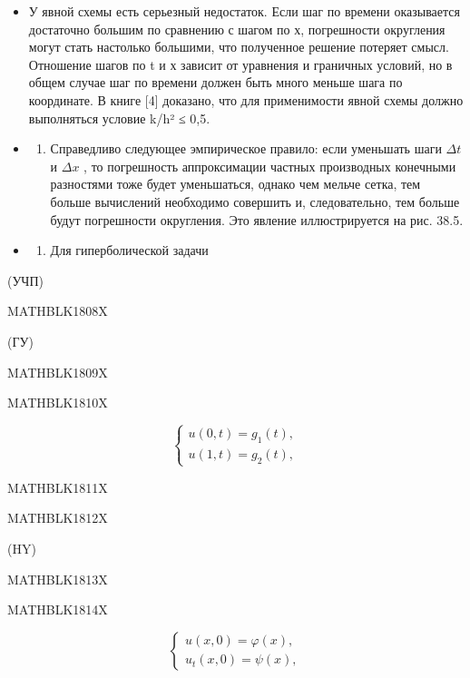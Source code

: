 \documentclass[
]{article}
\providecommand{\tightlist}{%
  \setlength{\itemsep}{0pt}\setlength{\parskip}{0pt}}
\begin{document}
\begin{itemize}
\tightlist
\item
  У явной схемы есть серьезный недостаток. Если шаг по времени
  оказывается достаточно большим по сравнению с шагом по х, погрешности
  округления могут стать настолько большими, что полученное решение
  потеряет смысл. Отношение шагов по t и х зависит от уравнения и
  граничных условий, но в общем случае шаг по времени должен быть много
  меньше шага по координате. В книге {[}4{]} доказано, что для
  применимости явной схемы должно выполняться условие k/h² ≤ 0,5.
\item
  \begin{enumerate}
  \def\labelenumi{\arabic{enumi}.}
  \setcounter{enumi}{1}
  \tightlist
  \item
    Справедливо следующее эмпирическое правило: если уменьшать шаги
    \(\Delta t\) и \(\Delta x\) , то погрешность аппроксимации частных
    производных конечными разностями тоже будет уменьшаться, однако чем
    мельче сетка, тем больше вычислений необходимо совершить и,
    следовательно, тем больше будут погрешности округления. Это явление
    иллюстрируется на рис. 38.5.
  \end{enumerate}
\item
  \begin{enumerate}
  \def\labelenumi{\arabic{enumi}.}
  \setcounter{enumi}{2}
  \tightlist
  \item
    Для гиперболической задачи
  \end{enumerate}
\end{itemize}

(УЧП)

MATHBLK1808X

(ГУ)

MATHBLK1809X

MATHBLK1810X

\[
\begin{cases} u(0, t) = g_1(t), \\ u(1, t) = g_2(t), \end{cases}
\]

MATHBLK1811X

MATHBLK1812X

(HY)

MATHBLK1813X

MATHBLK1814X

\[
\begin{cases} u(x, 0) = \varphi(x), \\ u_t(x, 0) = \psi(x), \end{cases}
\]
\end{document}
